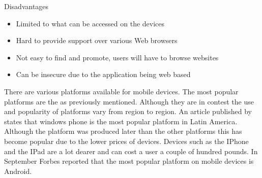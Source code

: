 Disadvantages
\begin{itemize}
	\item Limited to what can be accessed on the devices 
	\item Hard to provide support over various Web browsers
	\item Not easy to find and promote, users will have to browse websites 
	\item Can be insecure due to the application being web based 
\end{itemize}

There are various platforms available for mobile devices. The most popular platforms are the as previously mentioned. Although they are in contest the use and popularity of platforms vary from region to region. An article published by \citet{wpcentral13} states that windows phone is the most popular platform in Latin America. Although the platform was produced later than the other platforms this has become popular due to the lower prices of devices. Devices such as the IPhone and the IPad are a lot dearer and can cost a user a couple of hundred pounds. In September Forbes reported that the most popular platform on mobile devices is Android. 








